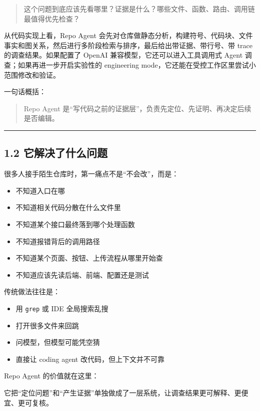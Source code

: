 \documentclass[UTF8,12pt,openany]{ctexbook}
\begin{document}
\begin{quote}
这个问题到底应该先看哪里？证据是什么？哪些文件、函数、路由、调用链最值得优先检查？
\end{quote}

从代码实现上看，Repo Agent 会先对仓库做静态分析，构建符号、代码块、文件事实和图关系，然后进行多阶段检索与排序，最后给出带证据、带行号、带 trace 的调查结果。如果配置了 OpenAI 兼容模型，它还可以进入工具调用式 Agent 调查；如果再进一步开启实验性的 engineering mode，它还能在受控工作区里尝试小范围修改和验证。\par

一句话概括：\par

\begin{quote}
Repo Agent 是“写代码之前的证据层”，负责先定位、先证明、再决定后续是否编辑。
\end{quote}

\hrule

\subsection{1.2 它解决了什么问题}

很多人接手陌生仓库时，第一痛点不是“不会改”，而是：\par

\begin{itemize}
\item 不知道入口在哪
\item 不知道相关代码分散在什么文件里
\item 不知道某个接口最终落到哪个处理函数
\item 不知道报错背后的调用路径
\item 不知道某个页面、按钮、上传流程从哪里开始查
\item 不知道应该先读后端、前端、配置还是测试
\end{itemize}

传统做法往往是：\par

\begin{itemize}
\item 用 \texttt{grep} 或 IDE 全局搜索乱搜
\item 打开很多文件来回跳
\item 问模型，但模型可能凭空猜
\item 直接让 coding agent 改代码，但上下文并不可靠
\end{itemize}

Repo Agent 的价值就在这里：  \par
它把“定位问题”和“产生证据”单独做成了一层系统，让调查结果更可解释、更便宜、更可复核。\par
\end{document}
